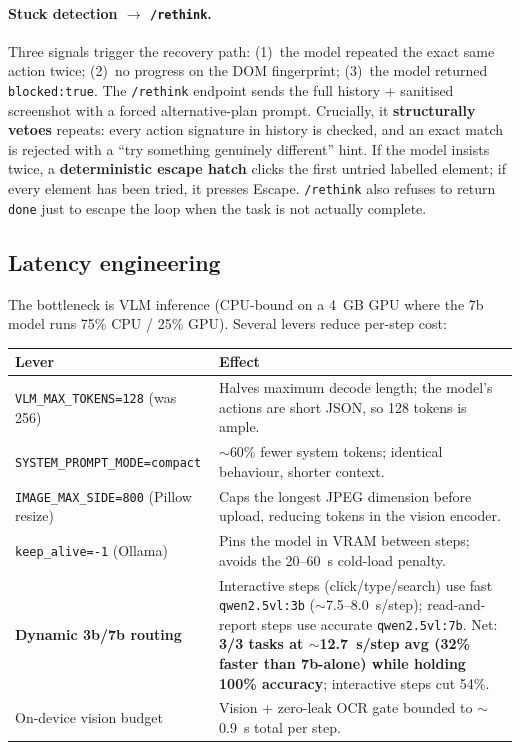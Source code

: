 \documentclass[11pt,a4paper]{article}
\newcommand{\code}[1]{\texttt{#1}}
\begin{document}
\paragraph{Stuck detection $\rightarrow$ \code{/rethink}.}
Three signals trigger the recovery path: (1)~the model repeated the exact same action twice; (2)~no progress on the DOM fingerprint; (3)~the model returned \code{blocked:true}. The \code{/rethink} endpoint sends the full history + sanitised screenshot with a forced alternative-plan prompt. Crucially, it \textbf{structurally vetoes} repeats: every action signature in history is checked, and an exact match is rejected with a ``try something genuinely different'' hint. If the model insists twice, a \textbf{deterministic escape hatch} clicks the first untried labelled element; if every element has been tried, it presses Escape. \code{/rethink} also refuses to return \code{done} just to escape the loop when the task is not actually complete.

\subsection{Latency engineering}
The bottleneck is VLM inference (CPU-bound on a 4~GB GPU where the 7b model runs 75\% CPU / 25\% GPU). Several levers reduce per-step cost:

\begin{table}[H]
\centering
\small
\begin{tabularx}{\textwidth}{@{}p{4.6cm} X@{}}
\toprule
\textbf{Lever} & \textbf{Effect}\\
\midrule
\code{VLM\_MAX\_TOKENS=128} (was 256) & Halves maximum decode length; the model's actions are short JSON, so 128 tokens is ample.\\
\addlinespace
\code{SYSTEM\_PROMPT\_MODE=compact} & $\sim$60\% fewer system tokens; identical behaviour, shorter context.\\
\addlinespace
\code{IMAGE\_MAX\_SIDE=800} (Pillow resize) & Caps the longest JPEG dimension before upload, reducing tokens in the vision encoder.\\
\addlinespace
\code{keep\_alive=-1} (Ollama) & Pins the model in VRAM between steps; avoids the 20--60~s cold-load penalty.\\
\addlinespace
\textbf{Dynamic 3b/7b routing} & Interactive steps (click/type/search) use fast \code{qwen2.5vl:3b} ($\sim$7.5--8.0~s/step); read-and-report steps use accurate \code{qwen2.5vl:7b}. Net: \textbf{3/3 tasks at $\sim$12.7~s/step avg (32\% faster than 7b-alone) while holding 100\% accuracy}; interactive steps cut 54\%.\\
\addlinespace
On-device vision budget & Vision + zero-leak OCR gate bounded to $\sim$0.9~s total per step.\\
\bottomrule
\end{tabularx}
\end{table}
\end{document}
